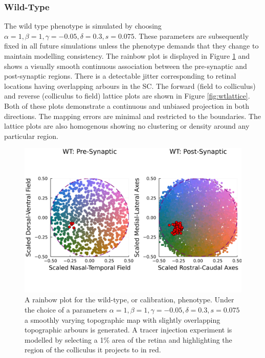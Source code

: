 \subsubsection{Wild-Type}
The wild type phenotype is simulated by choosing $\alpha = 1, \beta = 1, \gamma = -0.05, \delta = 0.3, s = 0.075$. These parameters are subsequently fixed in all future simulations unless the phenotype demands that they change to maintain modelling consistency. The rainbow plot is displayed in Figure \ref{fig:wtrainbow} and shows a visually smooth continuous association between the pre-synaptic and post-synaptic regions. There is a detectable jitter corresponding to retinal locations having overlapping arbours in the SC. The forward (field to colliculus) and reverse (colliculus to field) lattice plots are shown in Figure \ref{fig:wtlattice}. Both of these plots demonstrate a continuous and unbiased projection in both directions. The mapping errors are minimal and restricted to the boundaries. The lattice plots are also homogenous showing no clustering or density around any particular region.

\begin{figure}[hbt!]
	\centering
	\includegraphics[width=\textwidth]{images/distributed_kernels/figure_distributed_kernels_WT}
	\def\c{A rainbow plot for the wild-type, or calibration, phenotype. Under the choice of a parameters $\alpha = 1, \beta = 1, \gamma = -0.05, \delta = 0.3, s = 0.075$ a smoothly varying topographic map with slightly overlapping topographic arbours is generated. }
	\caption[\c]{\label{fig:wtrainbow} \c A tracer injection experiment is modelled by selecting a 1\% area of the retina and highlighting the region of the colliculus it projects to in red.}
\end{figure}

